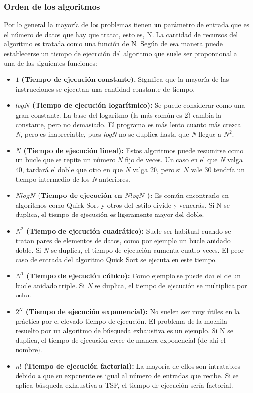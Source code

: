     
\subsubsection{Orden de los algoritmos}
Por lo general la mayoría de los problemas tienen un parámetro de entrada que es el número de datos que hay que tratar, esto es, N. La cantidad de recursos del algoritmo es tratada como una función de N. 
Según \cite {[NIVIZI]} de esa manera puede establecerse un tiempo de ejecución del algoritmo que suele ser proporcional a una de las siguientes funciones:
\begin{itemize}
\item \textbf{$1$ (Tiempo de ejecución constante): }Significa que la mayoría de las instrucciones se ejecutan una cantidad  constante de tiempo.
\item \textbf{$logN$ (Tiempo de ejecución logarítmico): }Se puede considerar como una gran constante. La base del logaritmo (la más común es 2) cambia la constante, pero no demasiado. El programa es más lento cuanto más crezca \textit{N}, pero es inapreciable, pues \textit{logN} no se duplica hasta que \textit{N} llegue a $N^2$.
\item \textbf{$N$ (Tiempo de ejecución lineal): }Estos algoritmos puede resumirse como un bucle que se repite un número \textit{N} fijo de veces. Un caso en el que \textit{N} valga 40, tardará el doble que otro en que \textit{N} valga 20, pero si \textit{N} vale 30 tendría un tiempo intermedio de los \textit{N} anteriores. 
\item \textbf{$NlogN$ (Tiempo de ejecución en $NlogN$ ): }Es común encontrarlo en algoritmos como Quick Sort y otros del estilo divide y vencerás. Si N se duplica, el tiempo de ejecución es ligeramente mayor del doble.
\item \textbf{$N^2$ (Tiempo de ejecución cuadrático): }Suele ser habitual cuando se tratan pares de elementos de datos, como por ejemplo un bucle anidado doble. Si \textit{N} se duplica, el tiempo de ejecución aumenta cuatro veces. El peor caso de entrada del algoritmo Quick Sort se ejecuta en este tiempo.
\item \textbf{$N^3$ (Tiempo de ejecución cúbico): }Como ejemplo se puede dar el de un bucle anidado triple. Si \textit{N} se duplica, el tiempo de ejecución se multiplica por ocho.
\item \textbf{$2^N$ (Tiempo de ejecución exponencial): }No suelen ser muy útiles en la práctica por el elevado tiempo de ejecución. El problema de la mochila resuelto por un algoritmo de búsqueda exhaustiva es un ejemplo. Si N se duplica, el tiempo de ejecución crece de manera exponencial (de ahí el nombre).
\item \textbf{$n!$ (Tiempo de ejecución factorial): }La mayoría de ellos son intratables debido a que su exponente es igual al número de entradas que recibe. Si se aplica búsqueda exhaustiva a TSP, el tiempo de ejecución sería factorial.
\end{itemize}

